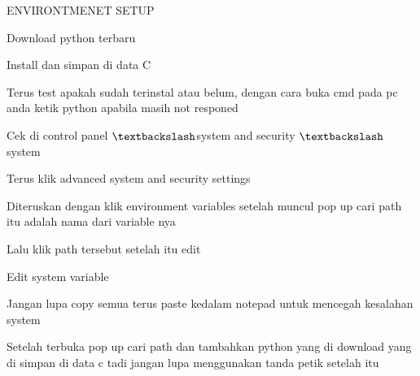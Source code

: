 
\sloppy
{\fontsize{14pt}{14pt}\selectfont ENVIRONTMENET SETUP \\} \par
\vspace{14pt}
\noindent 
{\fontsize{14pt}{14pt}\selectfont Download python terbaru \\} \par
\vspace{14pt}
\noindent 
{\fontsize{14pt}{14pt}\selectfont Install dan simpan di data C \\} \par
\vspace{14pt}
\noindent 
{\fontsize{14pt}{14pt}\selectfont Terus test apakah sudah terinstal atau belum, dengan cara buka cmd pada pc anda ketik python apabila masih not responed \\} \par
\vspace{14pt}
\noindent 
{\fontsize{14pt}{14pt}\selectfont Cek di control panel $  \textbackslash  $system and security $  \textbackslash  $system \\} \par
\vspace{14pt}
\noindent 
{\fontsize{14pt}{14pt}\selectfont Terus klik advanced system and security settings \\} \par
\vspace{14pt}
\noindent 
{\fontsize{14pt}{14pt}\selectfont Diteruskan dengan klik environment variables setelah muncul pop up cari path itu adalah nama dari variable nya \\} \par
\vspace{14pt}
\noindent 
{\fontsize{14pt}{14pt}\selectfont Lalu klik path tersebut setelah itu edit \\} \par
\vspace{14pt}
\noindent 
{\fontsize{14pt}{14pt}\selectfont Edit system variable \\} \par
\vspace{14pt}
\noindent 
{\fontsize{14pt}{14pt}\selectfont Jangan lupa copy semua terus paste kedalam notepad untuk mencegah kesalahan system \\} \par
\vspace{14pt}
\noindent 
{\fontsize{14pt}{14pt}\selectfont Setelah terbuka pop up cari path dan tambahkan python yang di download yang di simpan di data c tadi jangan lupa menggunakan tanda petik setelah itu \\} \par
